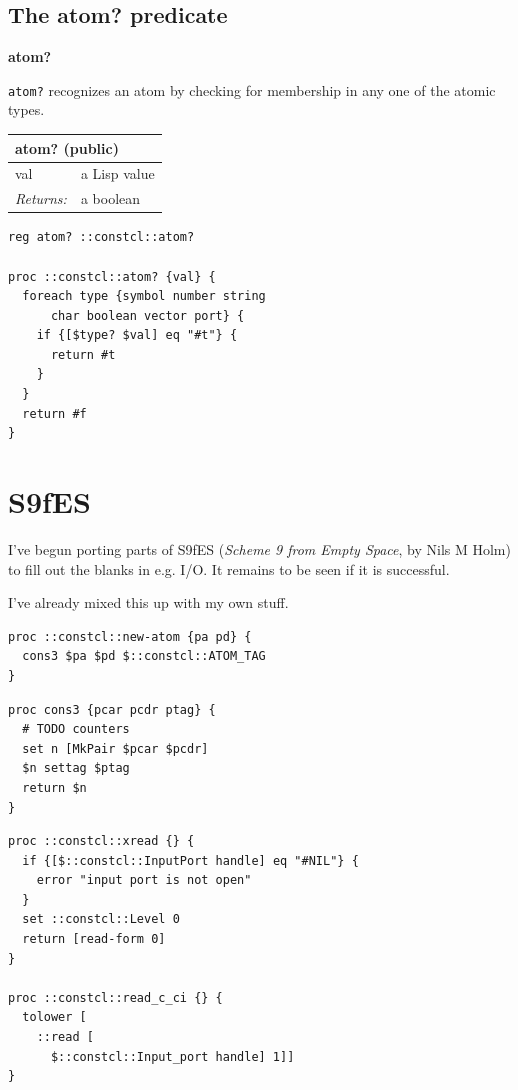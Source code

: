\documentclass[twoside,9pt]{report}
\begin{document}
\section{The atom? predicate}
\label{the-atom?-predicate}

\textbf{atom?}


\texttt{atom?} recognizes an atom by checking for membership in any one of the atomic types.

\begin{tabular}{ |l l| }
\hline
\multicolumn{2}{|l|}{atom? (public)} \\
\hline
val & a Lisp value \\
\textit{Returns:} & a boolean \\
\hline
\end{tabular}

\noindent\makebox[\linewidth]{\rule{\linewidth}{0.4pt}}
\begin{lstlisting}
reg atom? ::constcl::atom?
 
proc ::constcl::atom? {val} {
  foreach type {symbol number string
      char boolean vector port} {
    if {[$type? $val] eq "#t"} {
      return #t
    }
  }
  return #f
}
\end{lstlisting}
\noindent\makebox[\linewidth]{\rule{\linewidth}{0.4pt}}
\chapter{S9fES}
\label{s9fes}

I've begun porting parts of S9fES (\emph{Scheme 9 from Empty Space}, by Nils M Holm) to fill out the blanks in e.g. I/O. It remains to be seen if it is successful.


I've already mixed this up with my own stuff.

\noindent\makebox[\linewidth]{\rule{\linewidth}{0.4pt}}
\begin{lstlisting}
proc ::constcl::new-atom {pa pd} {
  cons3 $pa $pd $::constcl::ATOM_TAG
}
\end{lstlisting}
\noindent\makebox[\linewidth]{\rule{\linewidth}{0.4pt}}
\noindent\makebox[\linewidth]{\rule{\linewidth}{0.4pt}}
\begin{lstlisting}
proc cons3 {pcar pcdr ptag} {
  # TODO counters
  set n [MkPair $pcar $pcdr]
  $n settag $ptag
  return $n
}
\end{lstlisting}
\noindent\makebox[\linewidth]{\rule{\linewidth}{0.4pt}}
\noindent\makebox[\linewidth]{\rule{\linewidth}{0.4pt}}
\begin{lstlisting}
proc ::constcl::xread {} {
  if {[$::constcl::InputPort handle] eq "#NIL"} {
    error "input port is not open"
  }
  set ::constcl::Level 0
  return [read-form 0]
}
 
proc ::constcl::read_c_ci {} {
  tolower [
    ::read [
      $::constcl::Input_port handle] 1]]
}
\end{lstlisting}
\noindent\makebox[\linewidth]{\rule{\linewidth}{0.4pt}}
\end{document}
